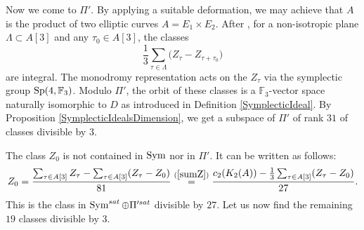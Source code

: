 Now we come to $\Pi'$. By applying a suitable deformation, we may achieve that $A$ is the product of two elliptic curves $A=E_1\times E_2$. After \cite[Eq.~(12)]{Hassett}, for a non-isotropic plane $\Lambda \subset A[3]$ and any $\tau_0\in A[3]$, the classes 
\begin{equation}
 \frac{1}{3}\sum_{\tau\in\Lambda} \Big(Z_{\tau} - Z_{\tau+\tau_0}\Big)
\end{equation}
are integral. The monodromy representation acts on the $Z_\tau$ via the symplectic group $\operatorname{Sp}(4,\mathbb F_3)$. Modulo $\Pi'$, the orbit of these classes is a $\mathbb F_3$-vector space naturally isomorphic to $D$ as introduced in Definition \ref{SymplecticIdeal}. By Proposition \ref{SymplecticIdealsDimension}, we get a subspace of $\Pi'$ of rank $31$ of classes divisible by $3$.

The class $Z_0$ is not contained in $\operatorname{Sym}$ nor in $\Pi'$.
It can be written as follows:
$$
Z_0=\frac{\sum_{\tau\in A[3]}Z_\tau-\sum_{\tau\in A[3]}(Z_\tau-Z_0)}{81}
\stackrel{(\ref{sumZ})}{=} \frac{c_2(K_2(A))-\frac{1}{3}\sum_{\tau\in A[3]}(Z_\tau-Z_0)}{27}.
$$
This is the class in $\operatorname{Sym}^{sat}\oplus \Pi'^{sat}$ divisible by $27$. Let us now find the remaining $19$ classes divisible by $3$.



